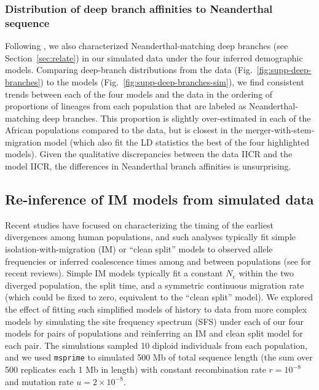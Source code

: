\documentclass[]{article}
\newcommand{\msprime}{\texttt{msprime}\xspace}
\begin{document}
\subsubsection{Distribution of deep branch affinities to Neanderthal sequence}

Following \citet{Speidel2019-nj}, we also characterized Neanderthal-matching
deep branches (see Section~\ref{sec:relate}) in our simulated data under the
four inferred demographic models. Comparing deep-branch distributions from the
data (Fig.~\ref{fig:supp-deep-branches}) to the models
(Fig.~\ref{fig:supp-deep-branches-sim}), we find consistent trends between each
of the four models and the data in the ordering of proportions of lineages from
each population that are labeled as Neanderthal-matching deep branches. This
proportion is slightly over-estimated in each of the African populations
compared to the data, but is closest in the merger-with-stem-migration model
(which also fit the LD statistics the best of the four highlighted models).
Given the qualitative discrepancies between the data IICR and the model IICR,
the differences in Neanderthal branch affinities is unsurprising.


\subsection{Re-inference of IM models from simulated data}
\label{sec:IM-reinfer}

Recent studies have focused on characterizing the timing of the earliest
divergences among human populations, and such analyses
typically fit simple isolation-with-migration (IM) or ``clean split'' models to
observed allele frequencies or inferred coalescence times among and between
populations (see \citet{Weaver2008-ho,Bergstrom2021-iw} for recent reviews).
Simple IM models
typically fit a constant $N_e$ within the two diverged population, the split
time, and a symmetric continuous migration rate (which could be fixed to zero,
equivalent to the ``clean split'' model). We explored the effect of fitting
such simplified models of history to data from more complex models by
simulating the site frequency spectrum (SFS) under each of our four models for
pairs of populations and reinferring an IM and clean split model for each pair.
The simulations sampled 10 diploid individuals from each
population, and we used \msprime \citep{Baumdicker2022-mj} to simulated
500 Mb of total sequence length (the sum over 500 replicates each 1 Mb in length)
with constant recombination rate $r=10^{-8}$ and mutation rate $u=2\times10^{-8}.$
\end{document}

